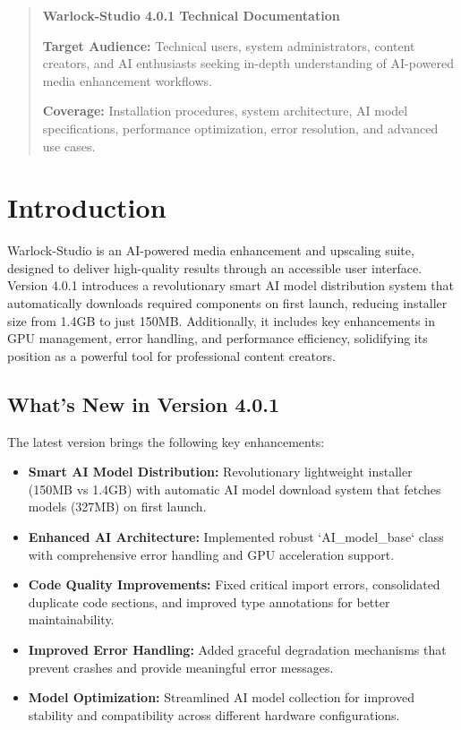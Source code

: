 \documentclass[11pt, a4paper]{article}
\begin{document}
\begin{abstract}
\noindent %
\textbf{Warlock-Studio 4.0.1 Technical Documentation}

\textbf{Target Audience:} Technical users, system administrators, content creators, and AI enthusiasts seeking in-depth understanding of AI-powered media enhancement workflows.

\textbf{Coverage:} Installation procedures, system architecture, AI model specifications, performance optimization, error resolution, and advanced use cases.
\end{abstract}

\newpage %
\tableofcontents %
\newpage %



\section{Introduction}
Warlock-Studio is an AI-powered media enhancement and upscaling suite, designed to deliver high-quality results through an accessible user interface. Version 4.0.1 introduces a revolutionary smart AI model distribution system that automatically downloads required components on first launch, reducing installer size from 1.4GB to just 150MB. Additionally, it includes key enhancements in GPU management, error handling, and performance efficiency, solidifying its position as a powerful tool for professional content creators.

\subsection{What's New in Version 4.0.1}
The latest version brings the following key enhancements:
\begin{itemize}[leftmargin=*]
    \item \textbf{Smart AI Model Distribution:} Revolutionary lightweight installer (150MB vs 1.4GB) with automatic AI model download system that fetches models (327MB) on first launch.
    \item \textbf{Enhanced AI Architecture:} Implemented robust `AI\_model\_base` class with comprehensive error handling and GPU acceleration support.
    \item \textbf{Code Quality Improvements:} Fixed critical import errors, consolidated duplicate code sections, and improved type annotations for better maintainability.
    \item \textbf{Improved Error Handling:} Added graceful degradation mechanisms that prevent crashes and provide meaningful error messages.
    \item \textbf{Model Optimization:} Streamlined AI model collection for improved stability and compatibility across different hardware configurations.
\end{itemize}
\end{document}
